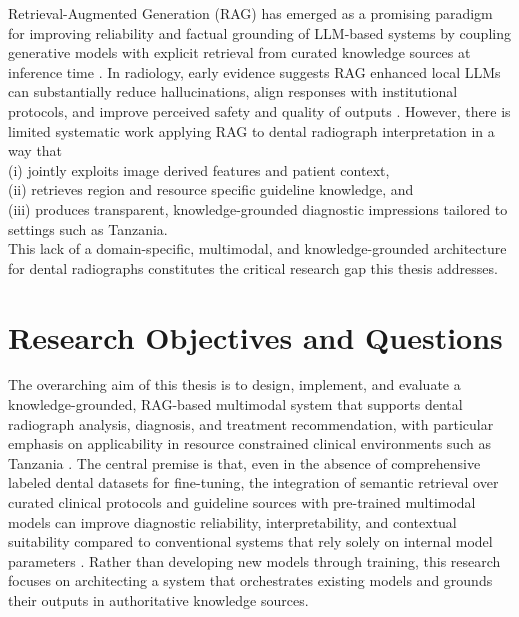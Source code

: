 \documentclass[12pt,a4paper]{report}
\begin{document}
	Retrieval-Augmented Generation (RAG) has emerged as a promising paradigm for improving reliability and factual grounding of LLM-based systems by coupling generative models with explicit retrieval from curated knowledge sources at inference time \cite{lewis2020retrieval,ji2023survey}. In radiology, early evidence suggests RAG enhanced local LLMs can substantially reduce hallucinations, align responses with institutional protocols, and improve perceived safety and quality of outputs \cite{Wada2025RAGRadiology,chatbots_Rajesh_2024}. However, there is limited systematic work applying RAG to dental radiograph interpretation in a way that \\
	(i) jointly exploits image derived features and patient context, \\
	(ii) retrieves region and resource specific guideline knowledge, and \\
	(iii) produces transparent, knowledge-grounded diagnostic impressions tailored to settings such as Tanzania. \\
	This lack of a domain-specific, multimodal, and knowledge-grounded architecture for dental radiographs constitutes the critical research gap this thesis addresses.
	
	
	\section{Research Objectives and Questions}
    \label{sec:objectives}
	
	The overarching aim of this thesis is to design, implement, and evaluate a knowledge-grounded, RAG-based multimodal system that supports dental radiograph analysis, diagnosis, and treatment recommendation, with particular emphasis on applicability in resource constrained clinical environments such as Tanzania \cite{Edward2024OralHealthTZ,inchingolo2025ai_dentistry_review}. The central premise is that, even in the absence of comprehensive labeled dental datasets for fine-tuning, the integration of semantic retrieval over curated clinical protocols and guideline sources with pre-trained multimodal models can improve diagnostic reliability, interpretability, and contextual suitability compared to conventional systems that rely solely on internal model parameters \cite{lewis2020retrieval,huang2023multimodal,schwendicke2022ai_global}. Rather than developing new models through training, this research focuses on architecting a system that orchestrates existing models and grounds their outputs in authoritative knowledge sources.
	
\end{document}
